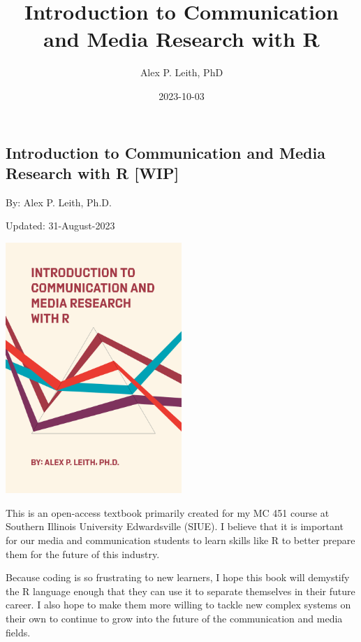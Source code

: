 \documentclass[
  b5paper]{book}
\title{Introduction to Communication and Media Research with R}
\author{Alex P. Leith, PhD}
\date{2023-10-03}
\begin{document}
\maketitle

{
\setcounter{tocdepth}{1}
\tableofcontents
}
\hypertarget{section}{%
\chapter*{}\label{section}}

\hypertarget{introduction-to-communication-and-media-research-with-r-wip}{%
\section*{Introduction to Communication and Media Research with R {[}WIP{]}}\label{introduction-to-communication-and-media-research-with-r-wip}}

By: Alex P. Leith, Ph.D.

Updated: 31-August-2023

\href{Current\%20Book\%20Cover\%20(Art\%20created\%20with\%20R\textquotesingle{}s\%20aRtsy\%20package)}{\includegraphics[width=0.5\textwidth,height=\textheight]{cover_2.png}}

This is an open-access textbook primarily created for my MC 451 course at Southern Illinois University Edwardsville (SIUE). I believe that it is important for our media and communication students to learn skills like R to better prepare them for the future of this industry.

Because coding is so frustrating to new learners, I hope this book will demystify the R language enough that they can use it to separate themselves in their future career. I also hope to make them more willing to tackle new complex systems on their own to continue to grow into the future of the communication and media fields.
\end{document}
